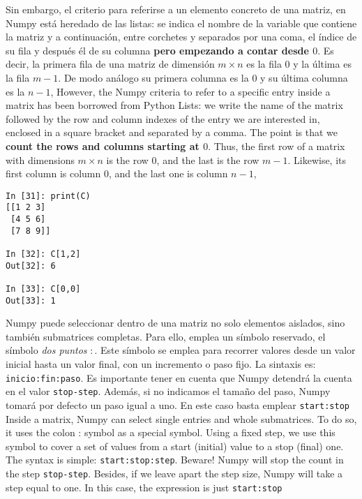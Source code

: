 \begin{paracol}{2}
Sin embargo,  el criterio para referirse a un elemento concreto de una matriz, en Numpy está heredado de las listas: se indica el nombre de la variable que contiene la matriz y a continuación, entre corchetes y separados por una coma, el índice de su fila y después él de su columna \textbf{pero empezando a contar desde $0$}. Es decir, la primera fila de una matriz de dimensión $m\times n$ es la fila $0$ y la última es la fila $m-1$. De modo análogo su primera columna es la $0$ y su última columna es la $n-1$,
\switchcolumn
However, the Numpy criteria to refer to a specific entry inside a matrix has been borrowed from Python Lists: we write the name of the matrix followed by the row and column indexes of the entry we are interested in, enclosed in a square bracket and separated by a comma. The point is that we \textbf{count the rows and columns starting at $0$}. Thus, the first row of a matrix with dimensions $m\times n$ is the row $0$, and the last is the row $m-1$. Likewise, its first column is column $0$, and the last one is column $n-1$, 
\end{paracol}
\begin{center}
    \begin{minipage}{0.3\textwidth}
        \begin{verbatim}
In [31]: print(C)
[[1 2 3]
 [4 5 6]
 [7 8 9]]

In [32]: C[1,2]
Out[32]: 6

In [33]: C[0,0]
Out[33]: 1
        \end{verbatim}
    \end{minipage}
\end{center}

\begin{paracol}{2}
Numpy puede seleccionar dentro de una matriz no solo elementos aislados, sino también submatrices completas. 
Para ello, emplea un símbolo reservado, el símbolo \emph{dos puntos} $:$. Este símbolo se emplea para recorrer valores desde un valor inicial hasta un valor final, con un incremento o paso fijo. La sintaxis es: \texttt{inicio:fin:paso}. Es importante tener en cuenta que Numpy detendrá la cuenta en el valor \texttt{stop-step}. Además, si no indicamos el tamaño del paso, Numpy tomará por defecto un paso igual a uno. En este caso basta emplear \texttt{start:stop}
\switchcolumn
Inside a matrix, Numpy can select single entries and whole submatrices. To do so, it uses the colon : symbol as a special symbol. Using a fixed step, we use this symbol to cover a set of values from a start (initial) value to a stop (final) one. The syntax is simple: \texttt{start:stop:step}. Beware! Numpy will stop the count in the step \texttt{stop-step}. Besides, if we leave apart the step size, Numpy will take a step equal to one. In this case, the expression is just \texttt{start:stop}
\end{paracol}

